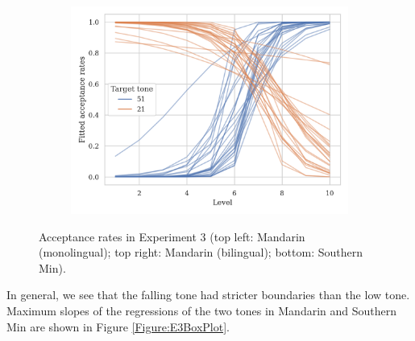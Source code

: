 \documentclass[12pt]{report}
\begin{document}
\begin{CJK}{UTF8}{bsmi}
\begin{figure}[hbt!]
\begin{subfigure}[b]{.45\textwidth}
\end{subfigure}
\hfill
\begin{subfigure}[b]{.45\textwidth}
\centering
\includegraphics[width=\textwidth]{Figures/E3/Min_E3_raw.png}
\end{subfigure}
\caption{Acceptance rates in Experiment 3 (top left: Mandarin (monolingual); top right: Mandarin (bilingual); bottom: Southern Min).}
\label{Figure:E3Raw}
\end{figure}

In general, we see that the falling tone had stricter boundaries than the low tone. Maximum slopes of the regressions of the two tones in Mandarin and Southern Min are shown in Figure \ref{Figure:E3BoxPlot}.


\end{CJK}
\end{document}
